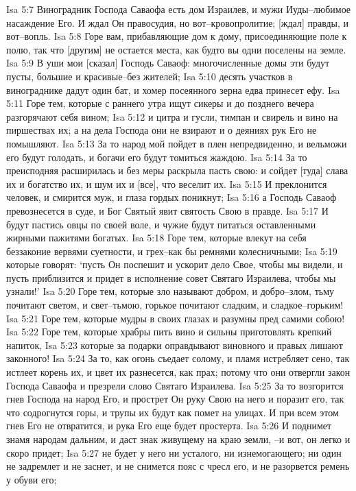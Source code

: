 Isa 5:7  Виноградник Господа Саваофа есть дом Израилев, и мужи Иуды--любимое насаждение Его. И ждал Он правосудия, но вот--кровопролитие; [ждал] правды, и вот--вопль.
Isa 5:8  Горе вам, прибавляющие дом к дому, присоединяющие поле к полю, так что [другим] не остается места, как будто вы одни поселены на земле.
Isa 5:9  В уши мои [сказал] Господь Саваоф: многочисленные домы эти будут пусты, большие и красивые--без жителей;
Isa 5:10  десять участков в винограднике дадут один бат, и хомер посеянного зерна едва принесет ефу.
Isa 5:11  Горе тем, которые с раннего утра ищут сикеры и до позднего вечера разгорячают себя вином;
Isa 5:12  и цитра и гусли, тимпан и свирель и вино на пиршествах их; а на дела Господа они не взирают и о деяниях рук Его не помышляют.
Isa 5:13  За то народ мой пойдет в плен непредвиденно, и вельможи его будут голодать, и богачи его будут томиться жаждою.
Isa 5:14  За то преисподняя расширилась и без меры раскрыла пасть свою: и сойдет [туда] слава их и богатство их, и шум их и [все], что веселит их.
Isa 5:15  И преклонится человек, и смирится муж, и глаза гордых поникнут;
Isa 5:16  а Господь Саваоф превознесется в суде, и Бог Святый явит святость Свою в правде.
Isa 5:17  И будут пастись овцы по своей воле, и чужие будут питаться оставленными жирными пажитями богатых.
Isa 5:18  Горе тем, которые влекут на себя беззаконие вервями суетности, и грех--как бы ремнями колесничными;
Isa 5:19  которые говорят: `пусть Он поспешит и ускорит дело Свое, чтобы мы видели, и пусть приблизится и придет в исполнение совет Святаго Израилева, чтобы мы узнали!'
Isa 5:20  Горе тем, которые зло называют добром, и добро--злом, тьму почитают светом, и свет--тьмою, горькое почитают сладким, и сладкое--горьким!
Isa 5:21  Горе тем, которые мудры в своих глазах и разумны пред самими собою!
Isa 5:22  Горе тем, которые храбры пить вино и сильны приготовлять крепкий напиток,
Isa 5:23  которые за подарки оправдывают виновного и правых лишают законного!
Isa 5:24  За то, как огонь съедает солому, и пламя истребляет сено, так истлеет корень их, и цвет их разнесется, как прах; потому что они отвергли закон Господа Саваофа и презрели слово Святаго Израилева.
Isa 5:25  За то возгорится гнев Господа на народ Его, и прострет Он руку Свою на него и поразит его, так что содрогнутся горы, и трупы их будут как помет на улицах. И при всем этом гнев Его не отвратится, и рука Его еще будет простерта.
Isa 5:26  И поднимет знамя народам дальним, и даст знак живущему на краю земли, --и вот, он легко и скоро придет;
Isa 5:27  не будет у него ни усталого, ни изнемогающего; ни один не задремлет и не заснет, и не снимется пояс с чресл его, и не разорвется ремень у обуви его;
